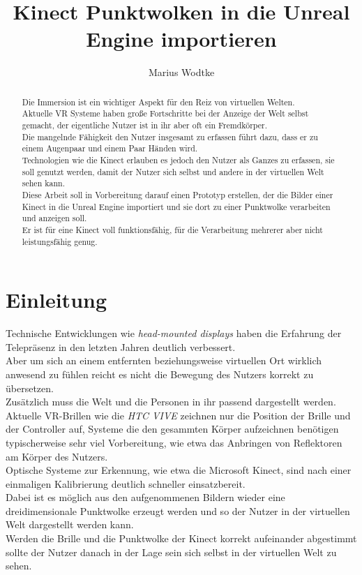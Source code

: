 \documentclass[a4paper]{IEEEtran}
\title{Kinect Punktwolken in die Unreal Engine importieren}
\author{Marius Wodtke}
\begin{document}
\maketitle

\begin{abstract}
	Die Immersion ist ein wichtiger Aspekt für den Reiz von virtuellen Welten. \\
	Aktuelle VR Systeme haben große Fortschritte bei der Anzeige der Welt selbst gemacht, der eigentliche Nutzer ist in ihr aber oft ein Fremdkörper.\\
	Die mangelnde Fähigkeit den Nutzer insgesamt zu erfassen führt dazu, dass er zu einem Augenpaar und einem Paar Händen wird. \\
	Technologien wie die Kinect erlauben es jedoch den Nutzer als Ganzes zu erfassen, sie soll genutzt werden, damit der Nutzer sich selbst und andere in der virtuellen Welt sehen kann.\\
	Diese Arbeit soll in Vorbereitung darauf einen Prototyp erstellen, der die Bilder einer Kinect in die Unreal Engine importiert und sie dort zu einer Punktwolke verarbeiten und anzeigen soll.\\
	Er ist für eine Kinect voll funktionsfähig, für die Verarbeitung mehrerer aber nicht leistungsfähig genug.\\
\end{abstract}

\section{Einleitung}
	Technische Entwicklungen wie {\textit{head-mounted displays}} haben die Erfahrung der Telepräsenz in den letzten Jahren deutlich verbessert. \\
	Aber um sich an einem entfernten beziehungsweise virtuellen Ort wirklich anwesend zu fühlen reicht es nicht die Bewegung des Nutzers korrekt zu übersetzen. \\
	Zusätzlich muss die Welt und die Personen in ihr passend dargestellt werden. \\
	Aktuelle VR-Brillen wie die \textit{HTC VIVE} zeichnen nur die Position der Brille und der Controller auf, Systeme die den gesammten Körper aufzeichnen benötigen typischerweise sehr viel Vorbereitung, wie etwa das Anbringen von Reflektoren am Körper des Nutzers. \\
	Optische Systeme zur Erkennung, wie etwa die Microsoft Kinect, sind nach einer einmaligen Kalibrierung deutlich schneller einsatzbereit. \\
	Dabei ist es möglich aus den aufgenommenen Bildern wieder eine dreidimensionale Punktwolke erzeugt werden und so der Nutzer in der virtuellen Welt dargestellt werden kann. \\
	Werden die Brille und die Punktwolke der Kinect korrekt aufeinander abgestimmt sollte der Nutzer danach in der Lage sein sich selbst in der virtuellen Welt zu sehen.\\
\end{document}
